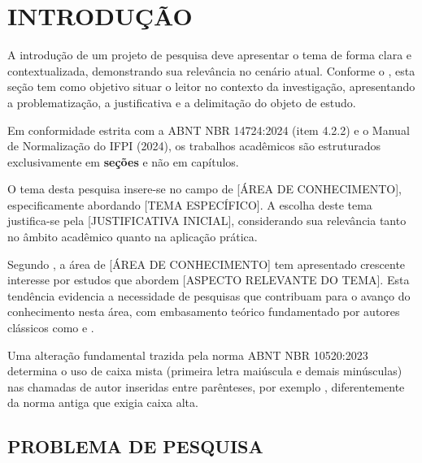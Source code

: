 \documentclass[
    12pt,        %
    openany,     %
    oneside,     %
    a4paper,     %
    english,     %
    brazil,      %
    article      %
]{abntex2}
\begin{document}
\frenchspacing




\section{INTRODUÇÃO}
\label{sec:introducao}

A introdução de um projeto de pesquisa deve apresentar o tema de forma clara e contextualizada, demonstrando sua relevância no cenário atual. Conforme o , esta seção tem como objetivo situar o leitor no contexto da investigação, apresentando a problematização, a justificativa e a delimitação do objeto de estudo.

Em conformidade estrita com a ABNT NBR 14724:2024 (item 4.2.2) e o Manual de Normalização do IFPI (2024), os trabalhos acadêmicos são estruturados exclusivamente em \textbf{seções} e não em capítulos. 

O tema desta pesquisa insere-se no campo de [ÁREA DE CONHECIMENTO], especificamente abordando [TEMA ESPECÍFICO]. A escolha deste tema justifica-se pela [JUSTIFICATIVA INICIAL], considerando sua relevância tanto no âmbito acadêmico quanto na aplicação prática.

Segundo , a área de [ÁREA DE CONHECIMENTO] tem apresentado crescente interesse por estudos que abordem [ASPECTO RELEVANTE DO TEMA]. Esta tendência evidencia a necessidade de pesquisas que contribuam para o avanço do conhecimento nesta área, com embasamento teórico fundamentado por autores clássicos como  e .

Uma alteração fundamental trazida pela norma ABNT NBR 10520:2023 determina o uso de caixa mista (primeira letra maiúscula e demais minúsculas) nas chamadas de autor inseridas entre parênteses, por exemplo \cite{marconi2017}, diferentemente da norma antiga que exigia caixa alta.


\subsection{PROBLEMA DE PESQUISA}
\label{subsec:problema}
\end{document}
